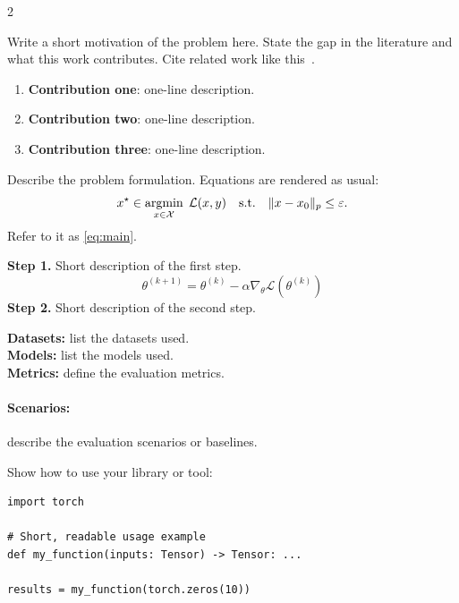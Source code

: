 \documentclass[portrait]{a0poster}
\begin{document}
\makeposterheader

\begin{multicols}{2}

\begin{posterbox}[Introduction]
Write a short motivation of the problem here. State the gap in the
literature and what this work contributes. Cite related work like
this~\cite{example2024}.
\begin{enumerate}
  \item \textbf{Contribution one}: one-line description.
  \item \textbf{Contribution two}: one-line description.
  \item \textbf{Contribution three}: one-line description.
\end{enumerate}
\end{posterbox}

\begin{posterbox}[Method]
Describe the problem formulation. Equations are rendered as usual:
\begin{equation}
  x^\star \in \operatorname*{argmin}_{x\in\mathcal{X}} \; \mathcal{L}(x, y) \quad
  \text{s.t.} \quad \|x - x_0\|_p \le \varepsilon .
  \label{eq:main}
\end{equation}
Refer to it as \cref{eq:main}.\smallskip

\textbf{Step 1.} Short description of the first step.
\begin{equation}
  \theta^{(k+1)} = \theta^{(k)} - \alpha \nabla_\theta \mathcal{L}(\theta^{(k)})
  \tag{S1}
\end{equation}
\textbf{Step 2.} Short description of the second step.
\end{posterbox}

\begin{posterbox}
\textbf{Datasets:} list the datasets used.\\
\textbf{Models:} list the models used.\\
\textbf{Metrics:} define the evaluation metrics.

\paragraph{Scenarios:} describe the evaluation scenarios or baselines.
\end{posterbox}

\begin{posterbox}[Code]
Show how to use your library or tool:
\begin{lstlisting}
import torch

# Short, readable usage example
def my_function(inputs: Tensor) -> Tensor: ...

results = my_function(torch.zeros(10))
\end{lstlisting}
\end{posterbox}

\end{multicols}
\end{document}

